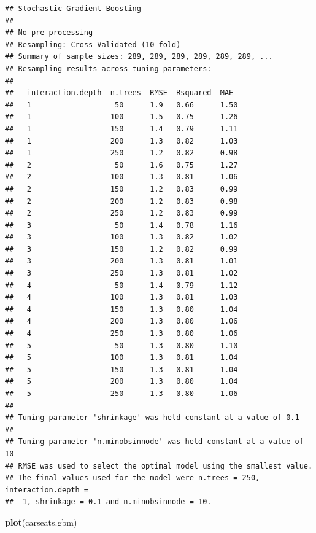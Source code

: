 \documentclass[
]{book}
\newenvironment{Shaded}{\begin{snugshade}}{\end{snugshade}}
\newcommand{\KeywordTok}[1]{\textcolor[rgb]{0.13,0.29,0.53}{\textbf{#1}}}
\newcommand{\NormalTok}[1]{#1}
\begin{document}
\begin{verbatim}
## Stochastic Gradient Boosting 
## 
## No pre-processing
## Resampling: Cross-Validated (10 fold) 
## Summary of sample sizes: 289, 289, 289, 289, 289, 289, ... 
## Resampling results across tuning parameters:
## 
##   interaction.depth  n.trees  RMSE  Rsquared  MAE 
##   1                   50      1.9   0.66      1.50
##   1                  100      1.5   0.75      1.26
##   1                  150      1.4   0.79      1.11
##   1                  200      1.3   0.82      1.03
##   1                  250      1.2   0.82      0.98
##   2                   50      1.6   0.75      1.27
##   2                  100      1.3   0.81      1.06
##   2                  150      1.2   0.83      0.99
##   2                  200      1.2   0.83      0.98
##   2                  250      1.2   0.83      0.99
##   3                   50      1.4   0.78      1.16
##   3                  100      1.3   0.82      1.02
##   3                  150      1.2   0.82      0.99
##   3                  200      1.3   0.81      1.01
##   3                  250      1.3   0.81      1.02
##   4                   50      1.4   0.79      1.12
##   4                  100      1.3   0.81      1.03
##   4                  150      1.3   0.80      1.04
##   4                  200      1.3   0.80      1.06
##   4                  250      1.3   0.80      1.06
##   5                   50      1.3   0.80      1.10
##   5                  100      1.3   0.81      1.04
##   5                  150      1.3   0.81      1.04
##   5                  200      1.3   0.80      1.04
##   5                  250      1.3   0.80      1.06
## 
## Tuning parameter 'shrinkage' was held constant at a value of 0.1
## 
## Tuning parameter 'n.minobsinnode' was held constant at a value of 10
## RMSE was used to select the optimal model using the smallest value.
## The final values used for the model were n.trees = 250, interaction.depth =
##  1, shrinkage = 0.1 and n.minobsinnode = 10.
\end{verbatim}

\begin{Shaded}
\begin{Highlighting}[]
\KeywordTok{plot}\NormalTok{(carseats.gbm)}
\end{Highlighting}
\end{Shaded}
\end{document}
